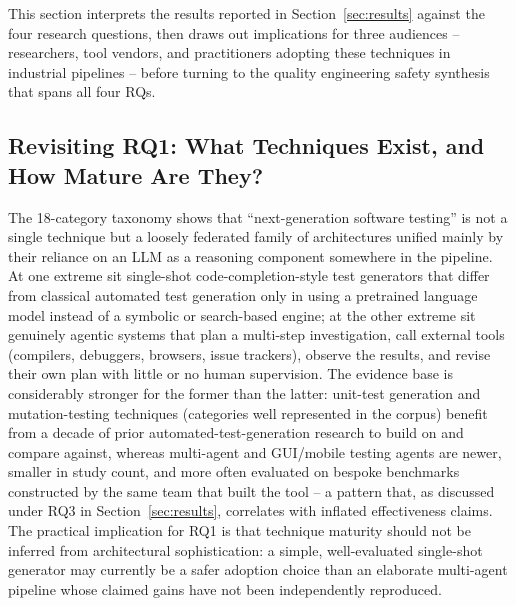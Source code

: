 %
This section interprets the results reported in
Section~\ref{sec:results} against the four research questions, then
draws out implications for three audiences -- researchers, tool
vendors, and practitioners adopting these techniques in industrial
pipelines -- before turning to the quality engineering safety synthesis
that spans all four RQs.

\subsection{Revisiting RQ1: What Techniques Exist, and How Mature Are They?}
The 18-category taxonomy shows that ``next-generation software
testing'' is not a single technique but a loosely federated family of
architectures unified mainly by their reliance on an LLM as a
reasoning component somewhere in the pipeline. At one extreme sit
single-shot code-completion-style test generators that differ from
classical automated test generation only in using a pretrained
language model instead of a symbolic or search-based engine; at the
other extreme sit genuinely agentic systems that plan a multi-step
investigation, call external tools (compilers, debuggers, browsers,
issue trackers), observe the results, and revise their own plan with
little or no human supervision. The evidence base is considerably
stronger for the former than the latter: unit-test generation and
mutation-testing techniques (categories well represented in the
corpus) benefit from a decade of prior automated-test-generation
research to build on and compare against, whereas multi-agent and
GUI/mobile testing agents are newer, smaller in study count, and more
often evaluated on bespoke benchmarks constructed by the same team
that built the tool -- a pattern that, as discussed under RQ3 in
Section~\ref{sec:results}, correlates with inflated effectiveness claims. The practical
implication for RQ1 is that technique maturity should not be inferred
from architectural sophistication: a simple, well-evaluated single-shot
generator may currently be a safer adoption choice than an elaborate
multi-agent pipeline whose claimed gains have not been independently
reproduced.


